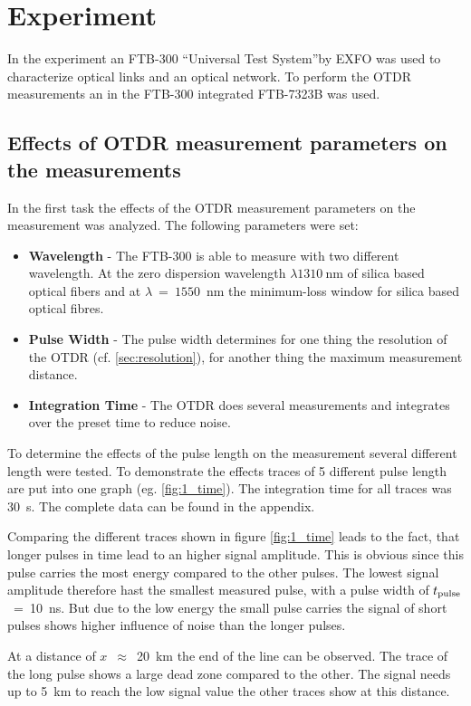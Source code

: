 \chapter{Experiment}
\label{ch:exp}
In the experiment an FTB-300 ``Universal Test System''by EXFO was used to characterize optical links and an optical network. To perform the OTDR measurements an in the FTB-300 integrated FTB-7323B was used.

\section{Effects of OTDR measurement parameters on the measurements}
In the first task the effects of the OTDR measurement parameters on the measurement was analyzed. 
The following parameters were set:
\begin{itemize}
	\item \textbf{Wavelength} - The FTB-300 is able to measure with two different wavelength. At the zero dispersion wavelength $\lambda 1310~$nm  of silica based optical fibers and at $\lambda~=~1550$~nm the minimum-loss window for silica based optical fibres.
	\item \textbf{Pulse Width} - The pulse width determines for one thing the resolution of the OTDR (cf. \ref{sec:resolution}), for another thing the maximum measurement distance. 
	\item \textbf{Integration Time} - The OTDR does several measurements and integrates over the preset time to reduce noise. 
\end{itemize}

To determine the effects of the pulse length on the measurement several different length were tested. To demonstrate the effects traces of 5 different pulse length are put into one graph (eg. \ref{fig:1_time}). The integration time for all traces was 30~s. The complete data can be found in the appendix.

Comparing the different traces shown in figure \ref{fig:1_time} leads to the fact, that longer pulses in time lead to an higher signal amplitude. This is obvious since this pulse carries the most energy compared to the other pulses. 
The lowest signal amplitude therefore hast the smallest measured pulse, with a pulse width of $t_{\mathrm{pulse}}$~=~10~ns. But due to the low energy the small pulse carries the signal of short pulses shows higher influence of noise than the longer pulses. 

At a distance of $x$~$\approx$~20~km the end of the line can be observed.
The trace of the long pulse shows a large dead zone compared to the other. The signal needs up to 5~km to reach the low signal value the other traces show at this distance. 


